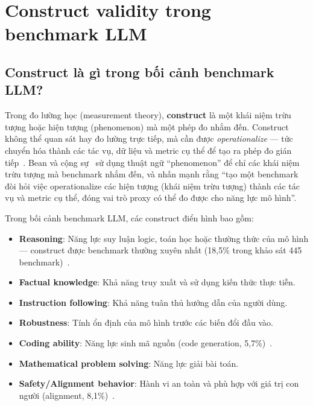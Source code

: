 
\section{Construct validity trong benchmark LLM}
\label{sec:construct_validity}

\subsection{Construct là gì trong bối cảnh benchmark LLM?}
\label{sec:what_is_construct}

Trong đo lường học (measurement theory), \textbf{construct} là một khái niệm trừu tượng hoặc hiện tượng (phenomenon) mà một phép đo nhắm đến. Construct không thể quan sát hay đo lường trực tiếp, mà cần được \textit{operationalize} --- tức chuyển hóa thành các tác vụ, dữ liệu và metric cụ thể để tạo ra phép đo gián tiếp~\cite{measuring_what_matters}. Bean và cộng sự~\cite{measuring_what_matters} sử dụng thuật ngữ ``phenomenon'' để chỉ các khái niệm trừu tượng mà benchmark nhắm đến, và nhấn mạnh rằng ``tạo một benchmark đòi hỏi việc operationalize các hiện tượng (khái niệm trừu tượng) thành các tác vụ và metric cụ thể, đóng vai trò proxy có thể đo được cho năng lực mô hình''.

Trong bối cảnh benchmark LLM, các construct điển hình bao gồm:

\begin{itemize}
    \item \textbf{Reasoning}: Năng lực suy luận logic, toán học hoặc thường thức của mô hình --- construct được benchmark thường xuyên nhất (18,5\% trong khảo sát 445 benchmark)~\cite{measuring_what_matters}.
    \item \textbf{Factual knowledge}: Khả năng truy xuất và sử dụng kiến thức thực tiễn.
    \item \textbf{Instruction following}: Khả năng tuân thủ hướng dẫn của người dùng.
    \item \textbf{Robustness}: Tính ổn định của mô hình trước các biến đổi đầu vào.
    \item \textbf{Coding ability}: Năng lực sinh mã nguồn (code generation, 5,7\%)~\cite{measuring_what_matters}.
    \item \textbf{Mathematical problem solving}: Năng lực giải bài toán.
    \item \textbf{Safety/Alignment behavior}: Hành vi an toàn và phù hợp với giá trị con người (alignment, 8,1\%)~\cite{measuring_what_matters}.
\end{itemize}

